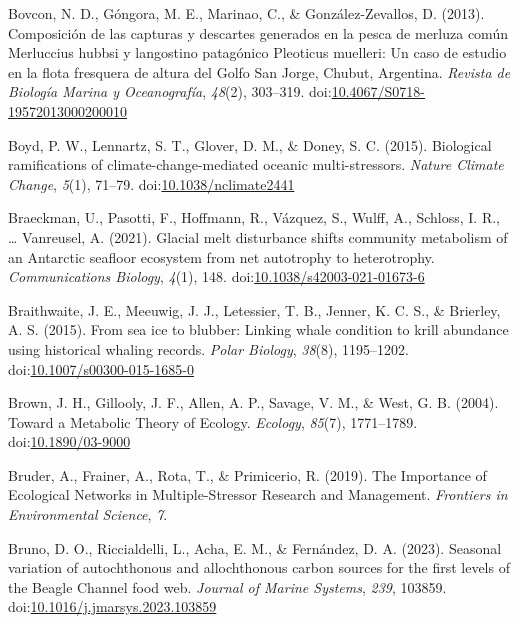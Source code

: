 \documentclass[
]{article}
\newlength{\cslhangindent}
\newenvironment{CSLReferences}[2] %
 {\begin{list}{}{%
  \setlength{\itemindent}{0pt}
  \setlength{\leftmargin}{0pt}
  \setlength{\parsep}{0pt}
  \ifodd #1
   \setlength{\leftmargin}{\cslhangindent}
   \setlength{\itemindent}{-1\cslhangindent}
  \fi
  \setlength{\itemsep}{#2\baselineskip}}}
 {\end{list}}
\begin{document}
\begin{CSLReferences}{1}{0}
Bovcon, N. D., Góngora, M. E., Marinao, C., \& González-Zevallos, D.
(2013). Composición de las capturas y descartes generados en la pesca de
merluza común {Merluccius} hubbsi y langostino patagónico {Pleoticus}
muelleri: Un caso de estudio en la flota fresquera de altura del {Golfo
San Jorge}, {Chubut}, {Argentina}. \emph{Revista de Biología Marina y
Oceanografía}, \emph{48}(2), 303--319.
doi:\href{https://doi.org/10.4067/S0718-19572013000200010}{10.4067/S0718-19572013000200010}

Boyd, P. W., Lennartz, S. T., Glover, D. M., \& Doney, S. C. (2015).
Biological ramifications of climate-change-mediated oceanic
multi-stressors. \emph{Nature Climate Change}, \emph{5}(1), 71--79.
doi:\href{https://doi.org/10.1038/nclimate2441}{10.1038/nclimate2441}

Braeckman, U., Pasotti, F., Hoffmann, R., Vázquez, S., Wulff, A.,
Schloss, I. R., \ldots{} Vanreusel, A. (2021). Glacial melt disturbance
shifts community metabolism of an {Antarctic} seafloor ecosystem from
net autotrophy to heterotrophy. \emph{Communications Biology},
\emph{4}(1), 148.
doi:\href{https://doi.org/10.1038/s42003-021-01673-6}{10.1038/s42003-021-01673-6}

Braithwaite, J. E., Meeuwig, J. J., Letessier, T. B., Jenner, K. C. S.,
\& Brierley, A. S. (2015). From sea ice to blubber: Linking whale
condition to krill abundance using historical whaling records.
\emph{Polar Biology}, \emph{38}(8), 1195--1202.
doi:\href{https://doi.org/10.1007/s00300-015-1685-0}{10.1007/s00300-015-1685-0}

Brown, J. H., Gillooly, J. F., Allen, A. P., Savage, V. M., \& West, G.
B. (2004). Toward a {Metabolic Theory} of {Ecology}. \emph{Ecology},
\emph{85}(7), 1771--1789.
doi:\href{https://doi.org/10.1890/03-9000}{10.1890/03-9000}

Bruder, A., Frainer, A., Rota, T., \& Primicerio, R. (2019). The
{Importance} of {Ecological Networks} in {Multiple-Stressor Research}
and {Management}. \emph{Frontiers in Environmental Science}, \emph{7}.

Bruno, D. O., Riccialdelli, L., Acha, E. M., \& Fernández, D. A. (2023).
Seasonal variation of autochthonous and allochthonous carbon sources for
the first levels of the {Beagle Channel} food web. \emph{Journal of
Marine Systems}, \emph{239}, 103859.
doi:\href{https://doi.org/10.1016/j.jmarsys.2023.103859}{10.1016/j.jmarsys.2023.103859}


\end{CSLReferences}
\end{document}
